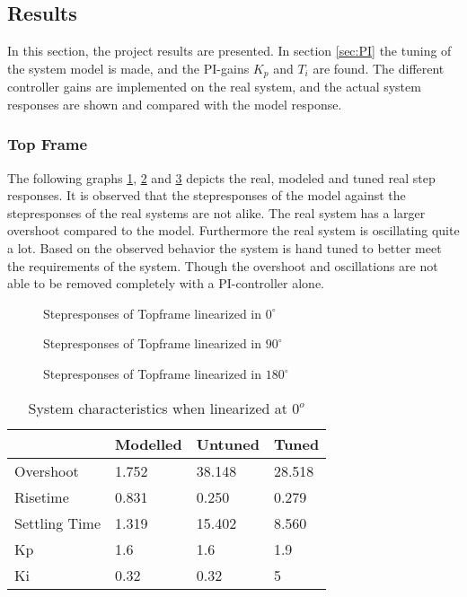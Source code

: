 \documentclass[../../Main]{subfiles}
\begin{document}
\subsection{Results}
\label{sec:results}
In this section, the project results are presented. In section \ref{sec:PI} the tuning of the system model is made, and the PI-gains $K_p$ and $T_i$ are found. The different controller gains are implemented on the real system, and the actual system responses are shown and compared
with the model response.

\subsubsection{Top Frame}
\label{sec:top_frame_results}

The following graphs \ref{fig:top_0}, \ref{fig:top_90} and \ref{fig:top_180} depicts the real, modeled and tuned real step responses.
It is observed that the stepresponses of the model against the stepresponses of the real
systems are not alike. The real system has a larger overshoot compared to the model.
Furthermore the real system is oscillating quite a lot. Based on the observed behavior
the system is hand tuned to better meet the requirements of the system. Though the
overshoot and oscillations are not able to be removed completely with a PI-controller
alone.


\begin{figure}[H]
  \def\svgwidth{\textwidth}
  
  \caption{Stepresponses of Topframe linearized in $0^{\circ}$}
  \label{fig:top_0}
\end{figure}


\begin{figure}[H]	
  \def\svgwidth{\textwidth}
  
  \caption{Stepresponses of Topframe linearized in $90^{\circ}$}
  \label{fig:top_90}
\end{figure}

\begin{figure}[H]
  \def\svgwidth{\textwidth}
  
  \caption{Stepresponses of Topframe linearized in $180^{\circ}$}
  \label{fig:top_180}
\end{figure}



\begin{table}[H]
	\centering
	\begin{tabular}{l|*{3}{l}}
		&Modelled&Untuned&Tuned\\
		\hline
		Overshoot&1.752&38.148&28.518\\
		Risetime&0.831&0.250&0.279\\
		Settling Time&1.319&15.402&8.560\\
		Kp&1.6&1.6&1.9\\
		Ki&0.32&0.32&5
	\end{tabular}
	\caption{System characteristics when linearized at $0^o$}
	\label{tab:0_top}
\end{table}
\end{document}
